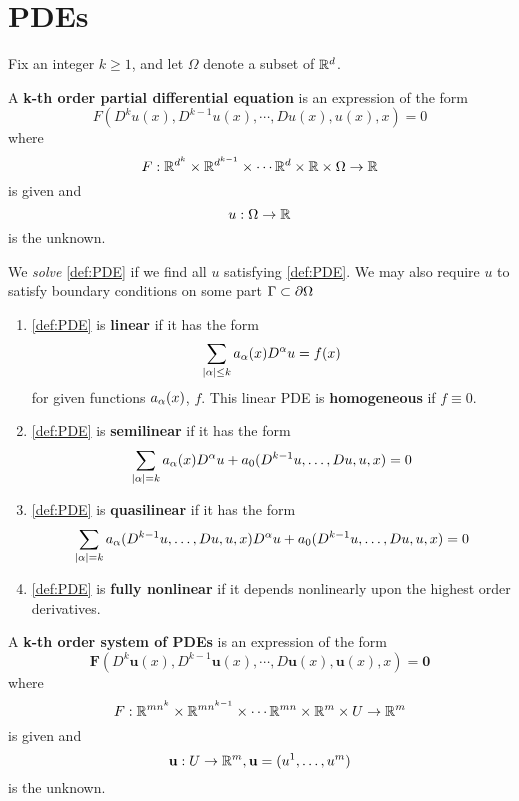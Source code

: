 \chapter{PDEs}

Fix an integer $k\geq 1$, and let $\Omega$ denote a subset of $\mathbb{R}^d$.

\begin{defn} A \textbf{k-th order partial differential equation} is an expression of the form 
\begin{equation}\label{def:PDE}
F(D^k u(x), D^{k-1} u(x), \cdots, D u(x), u(x), x)=0
\end{equation}
where 
\[ F:\mathbb{R}^{d^k} \times \mathbb{R}^{d^{k-1}} \times \cdots \mathbb{R}^d \times \mathbb{R} \times \Omega \rightarrow \mathbb{R} \]
is given and 
\[ u: \Omega \rightarrow \mathbb{R} \]
is the unknown.
\end{defn}

We \textit{solve} \ref{def:PDE} if we find all $u$ satisfying \ref{def:PDE}. We may also require $u$ to satisfy boundary conditions on some part $\Gamma \subset {\partial} \Omega$

\begin{defn}
\begin{enumerate}
\item \ref{def:PDE} is \textbf{linear} if it has the form
\[ \sum_{|{\alpha}| \leq k} a_{\alpha}(x) D^{{\alpha}} u = f(x) \]
for given functions $a_{\alpha}(x)$, $f$. This linear PDE is \textbf{homogeneous} if $f\equiv 0$.
\item \ref{def:PDE} is \textbf{semilinear} if it has the form
\[ \sum_{|{\alpha}| = k} a_{\alpha}(x) D^{{\alpha}} u + a_0(D^{k-1}u,\ldots,Du,u,x)=0 \]
\item \ref{def:PDE} is \textbf{quasilinear} if it has the form
\[ \sum_{|{\alpha}| = k} a_{\alpha}(D^{k-1}u,\ldots,Du,u,x)D^{{\alpha}} u+ a_0(D^{k-1}u,\ldots,Du,u,x)=0 \]
\item \ref{def:PDE} is \textbf{fully nonlinear} if it depends nonlinearly upon the highest order derivatives.
\end{enumerate}
\end{defn}

\begin{defn}
A \textbf{k-th order system of PDEs} is an expression of the form 
\begin{equation}\label{def:PDEsys}
\mathbf{F}(D^k \mathbf{u}(x), D^{k-1} \mathbf{u}(x), \cdots, D \mathbf{u}(x), \mathbf{u}(x), x)=\mathbf{0}
\end{equation}
where
\[ F:\mathbb{R}^{mn^k} \times \mathbb{R}^{mn^{k-1}} \times \cdots \mathbb{R}^{mn} \times \mathbb{R}^m \times U \rightarrow \mathbb{R}^m \]
is given and
\[ \mathbf{u}: U \rightarrow \mathbb{R}^m,  \mathbf{u}=(u^1,\ldots, u^m)\]
is the unknown.
\end{defn}

